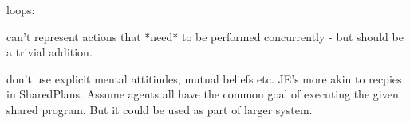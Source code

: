loops: \citep{levesque96what_is_planning,levesque05planning_with_loops}

can't represent actions that {*}need{*} to be performed concurrently
- but should be a trivial addition.

don't use explicit mental attitiudes, mutual beliefs etc. JE's more
akin to recpies in SharedPlans. Assume agents all have the common
goal of executing the given shared program. But it could be used as
part of larger system.

